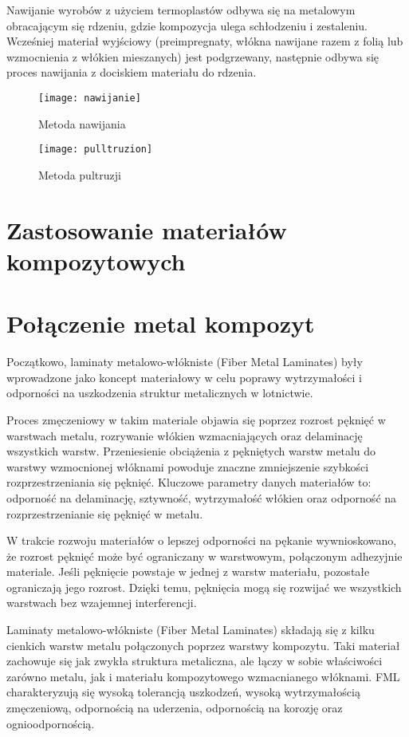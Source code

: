\documentclass[magister,druk]{dyplom}
\begin{document}
Nawijanie wyrobów z użyciem termoplastów odbywa się na metalowym obracającym się rdzeniu, gdzie kompozycja ulega schłodzeniu i zestaleniu. Wcześniej materiał wyjściowy (preimpregnaty, włókna nawijane razem z folią lub wzmocnienia z włókien mieszanych) jest podgrzewany, następnie odbywa się proces nawijania z dociskiem materiału do rdzenia. 

\begin{figure}[H]
	\texttt{[image: nawijanie]}
	\caption{Metoda nawijania\cite{Chawla1998}}
\end{figure}

\begin{figure}[H]
	\texttt{[image: pulltruzion]}
	\caption{Metoda pultruzji\cite{Chawla1998}}
\end{figure}

\section{Zastosowanie materiałów kompozytowych}
\section{Połączenie metal kompozyt}

Początkowo, laminaty metalowo-włókniste (Fiber Metal Laminates) były wprowadzone jako koncept materiałowy w celu poprawy wytrzymałości i odporności na uszkodzenia struktur metalicznych w lotnictwie.

Proces zmęczeniowy w takim materiale objawia się poprzez rozrost pęknięć w warstwach metalu, rozrywanie włókien wzmacniających oraz delaminację wszystkich warstw. Przeniesienie obciążenia z pękniętych warstw metalu do warstwy wzmocnionej włóknami powoduje znaczne zmniejszenie szybkości rozprzestrzeniania się pęknięć. Kluczowe parametry danych materiałów to: odporność na delaminację, sztywność, wytrzymałość włókien oraz odporność na rozprzestrzenianie się pęknięć w metalu.  

 W trakcie rozwoju materiałów o lepszej odporności na pękanie wywnioskowano, że rozrost pęknięć może być ograniczany w warstwowym, połączonym adhezyjnie materiale. Jeśli pęknięcie powstaje w jednej z warstw materiału, pozostałe ograniczają jego rozrost. Dzięki temu, pęknięcia mogą się rozwijać we wszystkich warstwach bez wzajemnej interferencji. 

Laminaty metalowo-włókniste (Fiber Metal Laminates) składają się z kilku cienkich warstw metalu połączonych poprzez warstwy kompozytu. Taki materiał zachowuje się jak zwykła struktura metaliczna, ale łączy w sobie właściwości zarówno metalu, jak i materiału kompozytowego wzmacnianego włóknami. FML charakteryzują się wysoką tolerancją uszkodzeń, wysoką wytrzymałością zmęczeniową, odpornością na uderzenia, odpornością na korozję oraz ognioodpornością\cite{FML}. 
\end{document}
